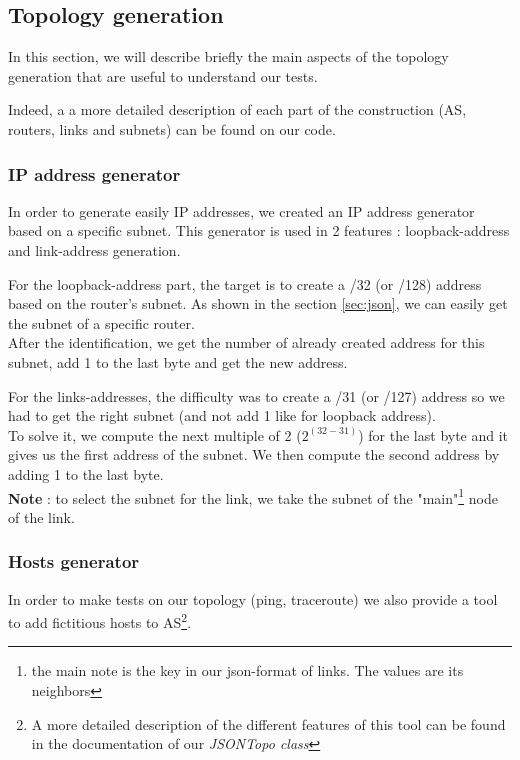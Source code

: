 \documentclass[letter, 9pt, conference]{ieeeconf}
\begin{document}
\subsection{Topology generation}

In this section, we will describe briefly the main aspects of the topology generation that are useful to understand our tests. 

Indeed, a a more detailed description of each part of the construction (AS, routers, links and subnets) can be found on our code. 

\subsubsection{IP address generator}

In order to generate easily IP addresses, we created an IP address generator based on a specific subnet. This generator is used in 2 features : loopback-address and link-address generation. 

For the loopback-address part, the target is to create a /32 (or /128) address based on the router's subnet. As shown in the section \ref{sec:json}, we can easily get the subnet of a specific router. \\
After the identification, we get the number of already created address for this subnet, add 1 to the last byte and get the new address. 

For the links-addresses, the difficulty was to create a /31 (or /127) address so we had to get the right subnet (and not add 1 like for loopback address). \\
To solve it, we compute the next multiple of 2 ($ 2^(32 - 31) $) for the last byte and it gives us the first address of the subnet. We then compute the second address by adding 1 to the last byte. \\
\textbf{Note} : to select the subnet for the link, we take the subnet of the "main"\footnote{the main note is the key in our json-format of links. The values are its neighbors} node of the link.

\subsubsection{Hosts generator}

In order to make tests on our topology (ping, traceroute) we also provide a tool to add fictitious hosts to AS\footnote{A more detailed description of the different features of this tool can be found in the documentation of our \textit{JSONTopo class}}.
\end{document}
